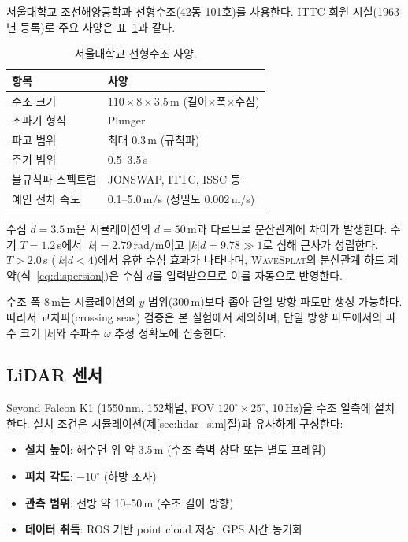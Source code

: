\documentclass[11pt]{report}
\numberwithin{equation}{chapter}
\numberwithin{figure}{chapter}
\numberwithin{table}{chapter}
\newcommand{\WS}{\textsc{WaveSplat}}
\begin{document}
서울대학교 조선해양공학과 선형수조(42동 101호)를 사용한다.
ITTC 회원 시설(1963년 등록)로 주요 사양은 표~\ref{tab:tank_spec}과 같다.

\begin{table}[H]
\centering
\caption{서울대학교 선형수조 사양.}
\label{tab:tank_spec}
\begin{tabular}{ll}
\toprule
항목 & 사양 \\
\midrule
수조 크기 & $110 \times 8 \times 3.5$\,m (길이$\times$폭$\times$수심) \\
조파기 형식 & Plunger \\
파고 범위 & 최대 0.3\,m (규칙파) \\
주기 범위 & 0.5--3.5\,s \\
불규칙파 스펙트럼 & JONSWAP, ITTC, ISSC 등 \\
예인 전차 속도 & 0.1--5.0\,m/s (정밀도 0.002\,m/s) \\
\bottomrule
\end{tabular}
\end{table}

수심 $d = 3.5$\,m은 시뮬레이션의 $d = 50$\,m과 다르므로 분산관계에 차이가 발생한다.
주기 $T = 1.2$\,s에서 $|k| = 2.79$\,rad/m이고 $|k|d = 9.78 \gg 1$로 심해 근사가 성립한다.
$T > 2.0$\,s ($|k|d < 4$)에서 유한 수심 효과가 나타나며,
\WS{}의 분산관계 하드 제약(식~\ref{eq:dispersion})은 수심 $d$를 입력받으므로
이를 자동으로 반영한다.

수조 폭 8\,m는 시뮬레이션의 $y$-범위(300\,m)보다 좁아 단일 방향 파도만 생성 가능하다.
따라서 교차파(crossing seas) 검증은 본 실험에서 제외하며,
단일 방향 파도에서의 파수 크기 $|k|$와 주파수 $\omega$ 추정 정확도에 집중한다.

\subsection{LiDAR 센서}

Seyond Falcon K1
(1550\,nm, 152채널, FOV $120^\circ \times 25^\circ$, 10\,Hz)을
수조 일측에 설치한다.
설치 조건은 시뮬레이션(제\ref{sec:lidar_sim}절)과 유사하게 구성한다:

\begin{itemize}
  \item \textbf{설치 높이}: 해수면 위 약 3.5\,m (수조 측벽 상단 또는 별도 프레임)
  \item \textbf{피치 각도}: $-10^\circ$ (하방 조사)
  \item \textbf{관측 범위}: 전방 약 10--50\,m (수조 길이 방향)
  \item \textbf{데이터 취득}: ROS 기반 point cloud 저장, GPS 시간 동기화
\end{itemize}
\end{document}
